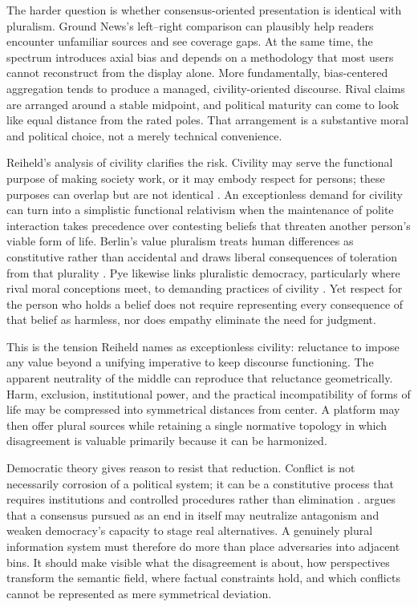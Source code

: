 The harder question is whether consensus-oriented presentation is identical with pluralism. Ground News's left--right comparison can plausibly help readers encounter unfamiliar sources and see coverage gaps. At the same time, the spectrum introduces axial bias and depends on a methodology that most users cannot reconstruct from the display alone. More fundamentally, bias-centered aggregation tends to produce a managed, civility-oriented discourse. Rival claims are arranged around a stable midpoint, and political maturity can come to look like equal distance from the rated poles. That arrangement is a substantive moral and political choice, not a merely technical convenience.

Reiheld's analysis of civility clarifies the risk. Civility may serve the functional purpose of making society work, or it may embody respect for persons; these purposes can overlap but are not identical \citep{reiheld2013}. An exceptionless demand for civility can turn into a simplistic functional relativism when the maintenance of polite interaction takes precedence over contesting beliefs that threaten another person's viable form of life. Berlin's value pluralism treats human differences as constitutive rather than accidental and draws liberal consequences of toleration from that plurality \citep{berlin1998}. Pye likewise links pluralistic democracy, particularly where rival moral conceptions meet, to demanding practices of civility \citep{pye1999}. Yet respect for the person who holds a belief does not require representing every consequence of that belief as harmless, nor does empathy eliminate the need for judgment.

This is the tension Reiheld names as exceptionless civility: reluctance to impose any value beyond a unifying imperative to keep discourse functioning. The apparent neutrality of the middle can reproduce that reluctance geometrically. Harm, exclusion, institutional power, and the practical incompatibility of forms of life may be compressed into symmetrical distances from center. A platform may then offer plural sources while retaining a single normative topology in which disagreement is valuable primarily because it can be harmonized.

Democratic theory gives reason to resist that reduction. Conflict is not necessarily corrosion of a political system; it can be a constitutive process that requires institutions and controlled procedures rather than elimination \citep{swanstromweissmann2005}. \citet{mouffe2000} argues that a consensus pursued as an end in itself may neutralize antagonism and weaken democracy's capacity to stage real alternatives. A genuinely plural information system must therefore do more than place adversaries into adjacent bins. It should make visible what the disagreement is about, how perspectives transform the semantic field, where factual constraints hold, and which conflicts cannot be represented as mere symmetrical deviation.

